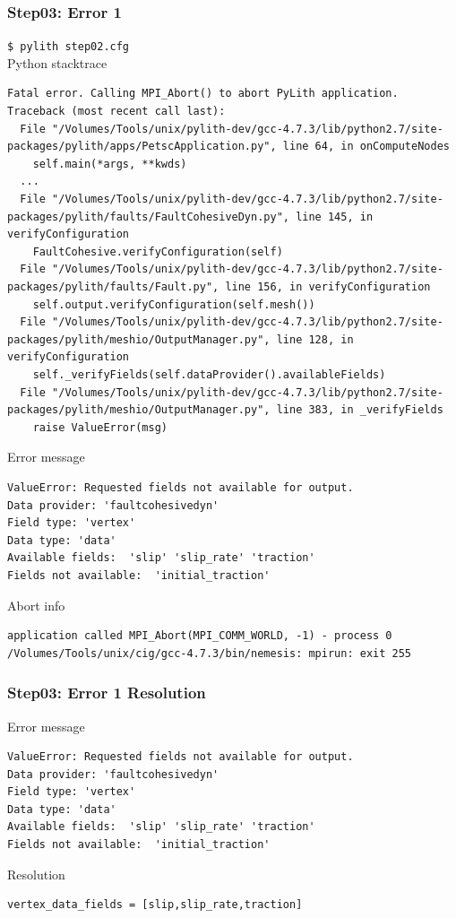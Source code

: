 \documentclass[aspectration=169]{beamer}
\newcommand{\cmd}[1]{{\footnotesize\tt \color{ltred}#1}}
\newcommand{\errlabel}[1]{{\small \color{blue}#1}}
\begin{document}
\begin{frame}[fragile]
  \frametitle{Step03: Error 1}

\cmd{\$ pylith step02.cfg}\\
\errlabel{Python stacktrace}
\begin{lstlisting}
Fatal error. Calling MPI_Abort() to abort PyLith application.
Traceback (most recent call last):
  File "/Volumes/Tools/unix/pylith-dev/gcc-4.7.3/lib/python2.7/site-packages/pylith/apps/PetscApplication.py", line 64, in onComputeNodes
    self.main(*args, **kwds)
  ...
  File "/Volumes/Tools/unix/pylith-dev/gcc-4.7.3/lib/python2.7/site-packages/pylith/faults/FaultCohesiveDyn.py", line 145, in verifyConfiguration
    FaultCohesive.verifyConfiguration(self)
  File "/Volumes/Tools/unix/pylith-dev/gcc-4.7.3/lib/python2.7/site-packages/pylith/faults/Fault.py", line 156, in verifyConfiguration
    self.output.verifyConfiguration(self.mesh())
  File "/Volumes/Tools/unix/pylith-dev/gcc-4.7.3/lib/python2.7/site-packages/pylith/meshio/OutputManager.py", line 128, in verifyConfiguration
    self._verifyFields(self.dataProvider().availableFields)
  File "/Volumes/Tools/unix/pylith-dev/gcc-4.7.3/lib/python2.7/site-packages/pylith/meshio/OutputManager.py", line 383, in _verifyFields
    raise ValueError(msg)
\end{lstlisting}
\errlabel{Error message}
\begin{lstlisting}
ValueError: Requested fields not available for output.
Data provider: 'faultcohesivedyn'
Field type: 'vertex'
Data type: 'data'
Available fields:  'slip' 'slip_rate' 'traction'
Fields not available:  'initial_traction'
\end{lstlisting}
\errlabel{Abort info}
\begin{lstlisting}
application called MPI_Abort(MPI_COMM_WORLD, -1) - process 0
/Volumes/Tools/unix/cig/gcc-4.7.3/bin/nemesis: mpirun: exit 255
\end{lstlisting}

\end{frame}


\begin{frame}[fragile]
  \frametitle{Step03: Error 1 Resolution}

\errlabel{Error message}
\begin{lstlisting}
ValueError: Requested fields not available for output.
Data provider: 'faultcohesivedyn'
Field type: 'vertex'
Data type: 'data'
Available fields:  'slip' 'slip_rate' 'traction'
Fields not available:  'initial_traction'
\end{lstlisting}\pause
\errlabel{Resolution}
\begin{lstlisting}
vertex_data_fields = [slip,slip_rate,traction]
\end{lstlisting}

\end{frame}
\end{document}
